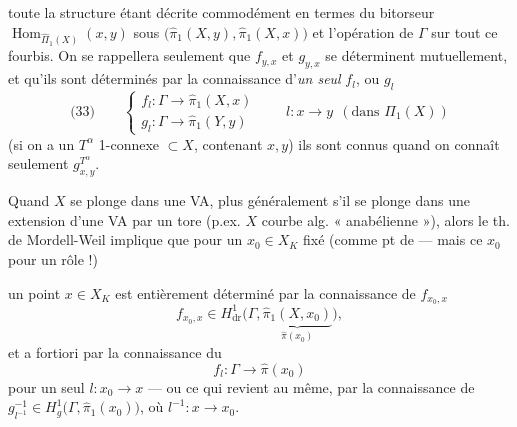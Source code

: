 \documentclass[11pt,a4paper]{article}
\begin{document}

toute la structure étant décrite commodément en termes du bitorseur $\operatorname{Hom}_{\widehat{\Pi}_1(X)}(x,y)$ sous $\bigl(\widehat{\pi}_1(X,y), \widehat{\pi}_1(X,x)\bigr)$ et l'opération de $\Gamma$ sur tout ce fourbis. On se rappellera seulement que $f_{y,x}$ et $g_{y,x}$ se déterminent mutuellement, et qu'ils sont déterminés par la connaissance d'\emph{un seul}   $f_l$, ou $g_l$
\[
\text{(33)}\qquad
\left\{
\begin{array}{l}
f_l : \Gamma \longrightarrow \widehat{\pi}_1(X,x) \\
g_l : \Gamma \longrightarrow \widehat{\pi}_1(Y,y)
\end{array}
\right.
\qquad l : x \to y \ \ (\text{dans } \Pi_1(X))
\]
(si on a  un $T^{\alpha}$ 1-connexe $\subset X$, contenant $x, y$) ils sont connus quand on connaît seulement $g^{T^{\alpha}}_{x,y}$.


Quand $X$ se plonge dans une VA, plus généralement s'il se plonge dans une extension d'une VA par un tore (p.ex. $X$ courbe alg. « anabélienne »), alors le th. de Mordell-Weil implique que pour un $x_0 \in X_K$ fixé (comme pt de  — mais ce $x_0$ \ill{} pour un rôle  !)

un point $x \in X_K$ est entièrement déterminé par la connaissance de $f_{x_0,x}$
\[
f_{x_0,x} \in H^1_{\mathrm{dr}}\bigl(\Gamma, \underbrace{\widehat{\pi}_1(X,x_0)}_{\widehat{\pi}(x_0)}\bigr),
\]
et a fortiori par la connaissance du 
\[
f_l : \Gamma \longrightarrow \widehat{\pi}(x_0)
\]
pour un seul $l : x_0 \to x$ — ou ce qui revient au même, par la connaissance de $g^{-1}_{l^{-1}} \in H^1_g\bigl(\Gamma, \widehat{\pi}_1(x_0)\bigr)$, où $l^{-1} : x \to x_0$.
\end{document}
